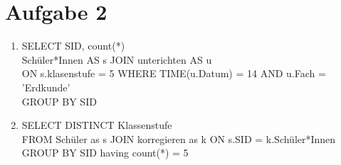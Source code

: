 \documentclass[12pt]{article}
\begin{document}
    \section*{Aufgabe 2}
    \begin{enumerate}[label=(\alph*)]
        \item SELECT SID, count(*)\\
        Schüler*Innen AS s JOIN unterichten AS u 
        \\ON s.klasenstufe = 5 WHERE  TIME(u.Datum) = 14 AND u.Fach = 'Erdkunde'\\
        GROUP BY SID 
        \item SELECT DISTINCT Klassenstufe \\
        FROM Schüler as s JOIN korregieren as k ON s.SID = k.Schüler*Innen
        GROUP BY SID having count(*) = 5
    \end{enumerate}
\end{document}
